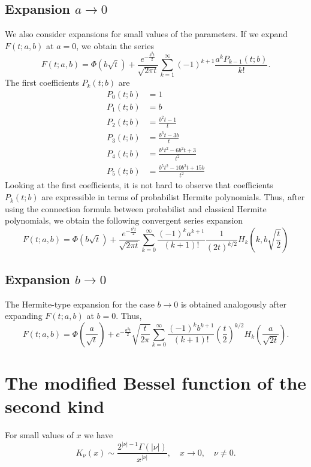 \documentclass[10pt,a4paper,oneside]{article}
\numberwithin{equation}{section}
\begin{document}
\subsection{Expansion $a \to 0$}
We also consider expansions for small values of the parameters. If we expand $F(t; a, b)$ at $a = 0$, we obtain the series
\begin{equation}
F(t; a, b) = \Phi\left(b\sqrt{t}\right) + \frac{e^{-\frac{b^2 t}{2}}}{\sqrt{2\pi t}}\sum_{k=1}^{\infty} (-1)^{k+1} \frac{a^k P_{k-1}(t; b)}{k!}.
\end{equation}
The first coefficients $P_k(t; b)$ are
\begin{align*}
P_0(t; b) &= 1\\
P_1(t; b) &= b\\
P_2(t; b) &= \frac{b^2 t - 1}{t}\\
P_3(t; b) &= \frac{b^3 t - 3b}{t}\\
P_4(t; b) &= \frac{b^4 t^2 - 6b^2t + 3}{t^2}\\
P_5(t; b) &= \frac{b^5 t^2 - 10b^3 t + 15 b}{t^2}
\end{align*}
Looking at the first coefficients, it is not hard to observe that coefficients $P_k(t;b)$ are expressible in terms of probabilist Hermite polynomials. Thus, after using the connection formula between probabilist and classical Hermite polynomials, we obtain the following convergent series expansion
\begin{equation}\label{phi_expansion_a_small}
F(t; a, b) = \Phi\left(b\sqrt{t}\right) + \frac{e^{-\frac{b^2 t}{2}}}{\sqrt{2\pi t}} \sum_{k=0}^{\infty} \frac{(-1)^k a^{k+1}}{(k+1)!}\frac{1}{(2t)^{k/2}} H_k\left(k, b\sqrt{\frac{t}{2}}\right)
\end{equation}

\subsection{Expansion $b \to 0$}
The Hermite-type expansion for the case $b \to 0$ is obtained analogously after expanding $F(t; a, b)$ at $b=0$. Thus,
\begin{equation}\label{phi_expansion_b_small}
F(t; a, b) = \Phi\left(\frac{a}{\sqrt{t}}\right) + e^{-\frac{a^2 t}{2}}\sqrt{\frac{t}{2\pi}} \sum_{k=0}^{\infty}\frac{(-1)^k b^{k+1}}{(k + 1)!}\left(\frac{t}{2}\right)^{k/2} H_k\left(\frac{a}{\sqrt{2t}}\right).
\end{equation}

\section{The modified Bessel function of the second kind}
For small values of $x$ we have
\begin{equation}\label{besselk_x_to_0}
K_{\nu}(x) \sim \frac{2^{|\nu| - 1} \Gamma(|\nu|)}{x^{|\nu|}}, \quad x \to 0, \quad \nu \neq 0.
\end{equation}
\end{document}
